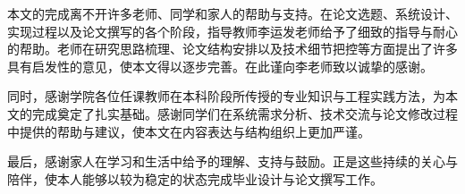 \acknowledgement

本文的完成离不开许多老师、同学和家人的帮助与支持。在论文选题、系统设计、实现过程以及论文撰写的各个阶段，指导教师李运发老师给予了细致的指导与耐心的帮助。老师在研究思路梳理、论文结构安排以及技术细节把控等方面提出了许多具有启发性的意见，使本文得以逐步完善。在此谨向李老师致以诚挚的感谢。

同时，感谢学院各位任课教师在本科阶段所传授的专业知识与工程实践方法，为本文的完成奠定了扎实基础。感谢同学们在系统需求分析、技术交流与论文修改过程中提供的帮助与建议，使本文在内容表达与结构组织上更加严谨。

最后，感谢家人在学习和生活中给予的理解、支持与鼓励。正是这些持续的关心与陪伴，使本人能够以较为稳定的状态完成毕业设计与论文撰写工作。